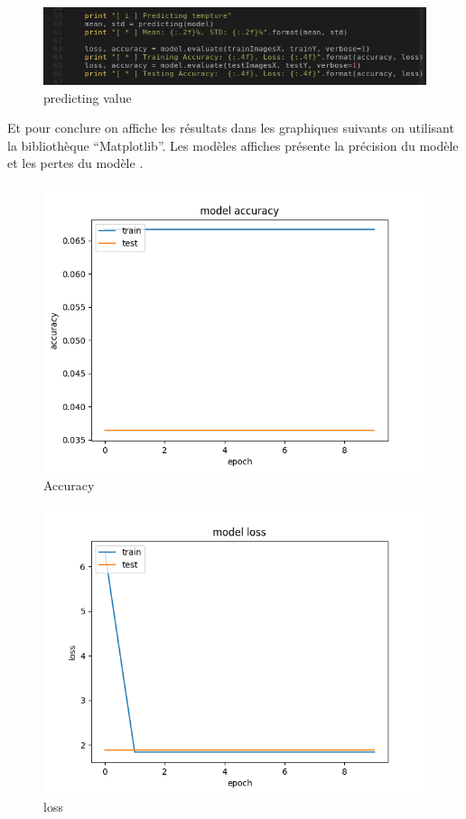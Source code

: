 \documentclass[12pt]{article}
\begin{document}
\begin{figure}[h]
	\centering
	\includegraphics[width=15cm]{img-Chapiter-4/predicting_value.png}
	\caption{predicting value}
	\label{fig:prediction}
\end{figure}

Et pour conclure on affiche les résultats dans les graphiques suivants on utilisant la bibliothèque “Matplotlib”. Les modèles affiches présente la précision du modèle et les pertes du modèle .
\newpage
\begin{figure}[h]
	\centering
	\includegraphics[width=15cm]{img-Chapiter-4/Figure_1.png}
	\caption{Accuracy}
\end{figure}

\newpage
\begin{figure}[h]
	\centering
	\includegraphics[width=15cm]{img-Chapiter-4/Figure_1-1.png}
	\caption{loss}
\end{figure}


\newpage
{}
	

	
\end{document}
